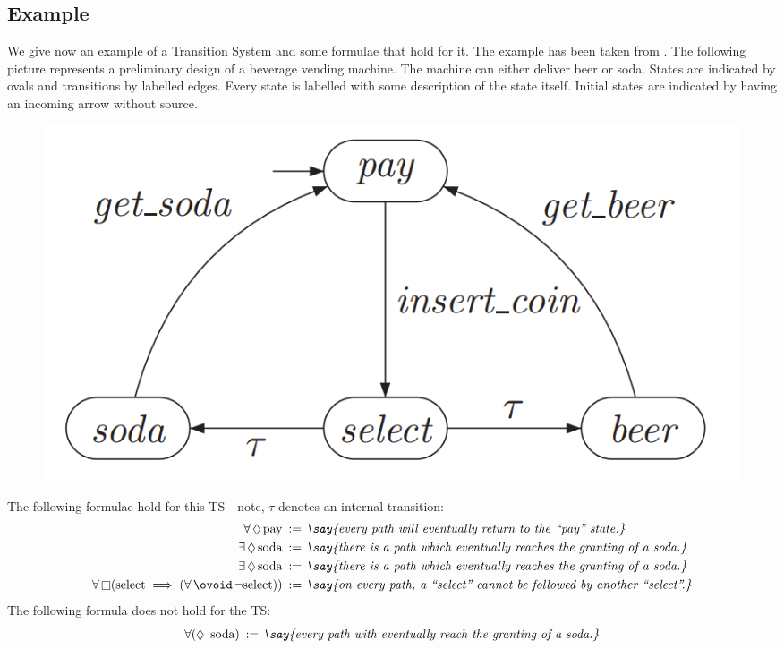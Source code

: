 \documentclass{article}
\newcommand{\saye}[1]{\emph{\say{#1}}}
\begin{document}
\subsection{Example} \label{subsec:example}
We give now an example of a Transition System and some formulae that hold for it. The example has been taken from \cite[Paragraph 2.1]{BaKa}.
The following picture represents a preliminary design of a beverage vending machine. 
The machine can either deliver beer or soda. States are indicated by ovals and transitions by labelled edges. 
Every state is labelled with some description of the state itself. Initial states are indicated by having an incoming arrow without source.
\begin{figure}[H]
  \begin{center}
      \includegraphics[scale = 0.50]{pictures/example.png}
  \end{center}
\end{figure}
The following formulae hold for this TS - note, $\tau$ denotes an internal transition:
\begin{alignat*}{3}
    \forall \lleven \text{pay} \, \, \, &  \text{:= \saye{every path will eventually return to the ``pay'' state.}} \\
    \exists \lleven \text{soda} \, \, \, & \text{:= \saye{there is a path which eventually reaches the granting of a soda.}} \\
    \exists \lleven \text{soda} \, \, \, & \text{:= \saye{there is a path which eventually reaches the granting of a soda.}} \\
    \forall \llglob (\text{select} \implies (\forall \lnext \neg \text{select})) \, \, \, & \text{:= \saye{on every path, a ``select'' cannot be followed by another ``select''.}} \\
\end{alignat*}
The following formula does not hold for the TS:
\begin{alignat*}{3}
    \forall (\lleven \text{ soda}) \, \, \, & \text{:= \saye{every path with eventually reach the granting of a soda.}} \\ 
\end{alignat*}
\end{document}
